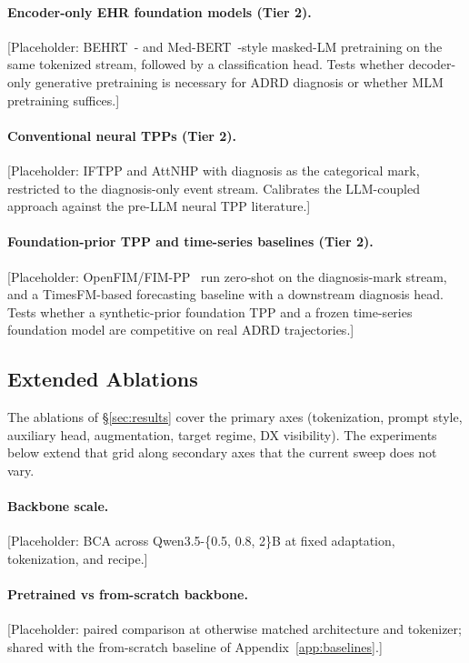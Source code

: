 \documentclass{article}
\begin{document}
\paragraph{Encoder-only EHR foundation models (Tier 2).}
[Placeholder: BEHRT~\citep{li2020behrt}- and Med-BERT~\citep{rasmy2021med}-style masked-LM pretraining on the same tokenized stream, followed by a classification head. Tests whether decoder-only generative pretraining is necessary for ADRD diagnosis or whether MLM pretraining suffices.]

\paragraph{Conventional neural TPPs (Tier 2).}
[Placeholder: IFTPP and AttNHP with diagnosis as the categorical mark, restricted to the diagnosis-only event stream. Calibrates the LLM-coupled approach against the pre-LLM neural TPP literature.]

\paragraph{Foundation-prior TPP and time-series baselines (Tier 2).}
[Placeholder: OpenFIM/FIM-PP~\citep{berghaus2026incontext} run zero-shot on the diagnosis-mark stream, and a TimesFM-based forecasting baseline with a downstream diagnosis head. Tests whether a synthetic-prior foundation TPP and a frozen time-series foundation model are competitive on real ADRD trajectories.]

\subsection{Extended Ablations}
\label{app:extra_ablations}

The ablations of \S\ref{sec:results} cover the primary axes (tokenization, prompt style, auxiliary head, augmentation, target regime, DX visibility). The experiments below extend that grid along secondary axes that the current sweep does not vary.

\paragraph{Backbone scale.}
[Placeholder: BCA across Qwen3.5-\{0.5, 0.8, 2\}B at fixed adaptation, tokenization, and recipe.]

\paragraph{Pretrained vs from-scratch backbone.}
[Placeholder: paired comparison at otherwise matched architecture and tokenizer; shared with the from-scratch baseline of Appendix~\ref{app:baselines}.]
\end{document}

